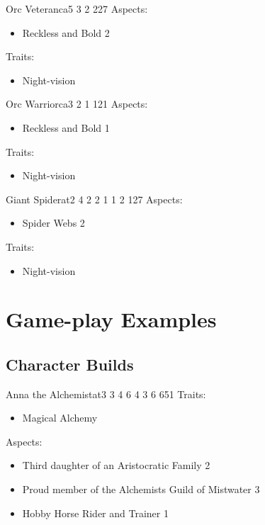 \documentclass[11pt]{article}
\begin{document}
{\begin{npc}{Orc Veteran}{ca}{5 3 2 2}{27}
Aspects:
\begin{itemize}
\item Reckless and Bold 2
\end{itemize}
Traits:
\begin{itemize}
\item Night-vision
\end{itemize}
\end{npc}

\begin{npc}{Orc Warrior}{ca}{3 2 1 1}{21}
Aspects:
\begin{itemize}
\item Reckless and Bold 1
\end{itemize}
Traits:
\begin{itemize}
\item Night-vision
\end{itemize}
\end{npc}

\begin{npc}{Giant Spider}{at}{2 4 2 2 1 1 2 1}{27}
Aspects:
\begin{itemize}
\item Spider Webs 2
\end{itemize}
Traits:
\begin{itemize}
\item Night-vision
\end{itemize}
\end{npc}


\newpage
\section{Game-play Examples}
\label{sec:org38930b5}
\subsection{Character Builds}
\label{sec:orgb1c6619}

\begin{npc}{Anna the Alchemist}{at}{3 3 4 6 4 3 6 6}{51}
Traits:
\begin{itemize}
\item Magical Alchemy
\end{itemize}
\columnbreak
Aspects:
\begin{itemize}
\item Third daughter of an Aristocratic Family 2
\item Proud member of the Alchemists Guild of Mistwater 3
\item Hobby Horse Rider and Trainer 1
\end{itemize}
\end{npc}

}
\end{document}
